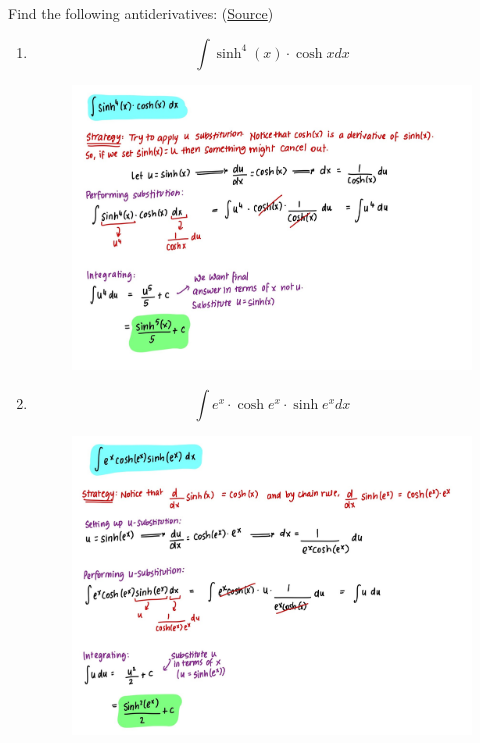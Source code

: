 \documentclass{article}
\begin{document}
\newpage
\noindent Find the following antiderivatives: 
\newline (\href{https://www.deanza.edu/faculty/kleincharles/documents/HyperbolicFunctionsProblems.pdf}{Source})
\begin{enumerate}
    \item $$\int \sinh^4(x) \cdot \cosh x dx$$
    \begin{figure}[H]
        \centering
        \includegraphics[width=\linewidth]{Q1.1.jpg}
        \label{fig:Q1.1}
    \end{figure}
    \newpage
    \item $$\int e^x \cdot \cosh e^x \cdot \sinh e^x dx$$
    \begin{figure}[H]
        \centering
        \includegraphics[width=\linewidth]{Q1.2.jpg}

\end{figure}
\end{enumerate}
\end{document}
